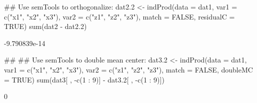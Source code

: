 \begin{Schunk}
\begin{Sinput}
 ## Use semTools to orthogonalize:
 dat2.2 <- indProd(data = dat1,
                   var1 = c("x1", "x2", "x3"),
                   var2 = c("z1", "z2", "z3"),
                   match = FALSE,
                   residualC = TRUE)
 sum(dat2 - dat2.2)
\end{Sinput}
\begin{Soutput}
[1] -9.790839e-14
\end{Soutput}
\begin{Sinput}
 ##
 ## Use semTools to double mean center:
 dat3.2 <- indProd(data = dat1,
                   var1 = c("x1", "x2", "x3"),
                   var2 = c("z1", "z2", "z3"),
                   match = FALSE,
                   doubleMC = TRUE)
 sum(dat3[ , -c(1 : 9)] - dat3.2[ , -c(1 : 9)])
\end{Sinput}
\begin{Soutput}
[1] 0
\end{Soutput}
\end{Schunk}
